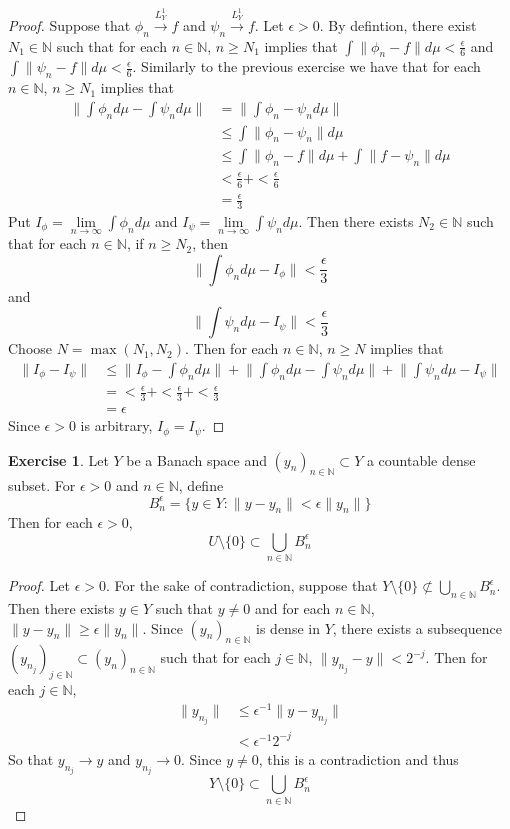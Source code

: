 \documentclass[12pt]{amsart}
\theoremstyle{definition}
\newtheorem{ex}[definition]{Exercise}
\newcommand{\ep}{\epsilon}
\newcommand{\N}{\mathbb{N}}
\newcommand{\conv}[1]{\xrightarrow{#1}}
\begin{document}
	\begin{proof}
	Suppose that $\phi_n \conv{L^1_Y} f$ and $\psi_n \conv{L^1_Y} f$. Let $\ep >0$. By defintion, there exist $N_1 \in \N$ such that for each $n \in \N$, $ n \geq N_1$ implies that $\int \|\phi_n - f\| d\mu < \frac{\ep}{6}$ and $\int \|\psi_n - f\| d\mu < \frac{\ep}{6}$. Similarly to the previous exercise we have that for each $n \in \N$, $n \geq N_1$ implies that
	\begin{align*}
	\bigg \| \int \phi_n d\mu  - \int \psi_n d \mu \bigg \|
	&= \bigg \| \int \phi_n - \psi_n d\mu \bigg \| \\
	& \leq \int \| \phi_n - \psi_n \| d\mu \\
	& \leq  \int \| \phi_n -f \| d \mu + \int \| f - \psi_n \| d\mu 	\\
	& <  \frac{\ep}{6} + < \frac{\ep}{6} \\
	&= \frac{\ep}{3}
	\end{align*}	 
Put $I_\phi = \lim\limits_{n \rightarrow \infty} \int \phi_n d\mu$ and $I_{\psi} = \lim\limits_{n \rightarrow \infty} \int \psi_n d\mu$. Then there exists $N_2 \in \N$ such that for each $n \in \N$, if $ n \geq N_2$, then $$\bigg \| \int \phi_n d\mu - I_\phi \bigg \| < \frac{\ep}{3}$$ and $$\bigg \| \int \psi_n d\mu - I_\psi \bigg \| < \frac{\ep}{3}$$ 
	Choose $N = \max(N_1, N_2)$. Then for each $n \in \N$, $n \geq N$ implies that
	\begin{align*}
	\|I_\phi - I_\psi\| 
	& \leq \bigg \|I_\phi - \int \phi_n d\mu \bigg \| + \bigg \| \int \phi_n d\mu - \int \psi_n d\mu \bigg \| +  \bigg \| \int \psi_n d\mu - I_\psi \bigg \| \\
	& = < \frac{\ep}{3} + < \frac{\ep}{3} + < \frac{\ep}{3} \\
	&= \ep
	\end{align*}
	Since $\ep >0$ is arbitrary, $I_\phi = I_\psi$.
	\end{proof}
	
	\begin{ex}
	Let $Y$ be a Banach space and $(y_n)_{n \in \N} \subset Y$ a countable dense subset. For $\ep >0$ and $n \in \N$, define $$B^{\ep}_n = \{y \in Y: \|y - y_n\| < \ep \| y_n \| \}$$ Then for each $\ep > 0$, $$U \setminus \{ 0 \} \subset \bigcup\limits_{n \in \N}B^{\ep}_n$$
	\end{ex}	
	
	\begin{proof}
	Let $\ep >0$. For the sake of contradiction, suppose that $Y\setminus \{ 0 \} \not \subset \bigcup\limits_{n \in \N}B^{\ep}_n$. Then there exists $y \in Y$ such that $y \neq 0$ and for each $n \in \N$, $\|y- y_n\| \geq \ep \|y_n\|$. Since $(y_n)_{n \in \N}$ is dense in $Y$, there exists a subsequence $(y_{n_j})_{j \in \N} \subset (y_n)_{n \in \N}$ such that for each $j \in \N$, $\|y_{n_j} - y\| < 2^{-j}$. Then for each $j \in \N$,
	\begin{align*}
	\|y_{n_j}\| 
	& \leq  \ep^{-1}\|y- y_{n_j}\| \\
	& < \ep^{-1}2^{-j}
	\end{align*}
	So that $y_{n_j} \rightarrow y$ and $y_{n_j} \rightarrow 0$. Since $y \neq 0$, this is a contradiction and thus $$Y \setminus \{ 0 \} \subset \bigcup\limits_{n \in \N}B^{\ep}_n$$
	\end{proof}
	
\end{document}
